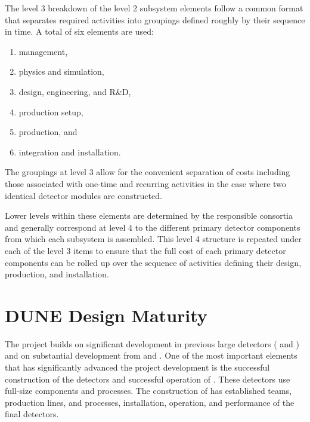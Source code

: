 The level 3 breakdown of the level 2 subsystem  elements follow 
a common format that separates required activities into groupings defined 
roughly by their sequence in time.  A total of six elements are used:     
\begin{enumerate}
  \item management,
  \item physics and simulation,
  \item design, engineering, and R\&D,
  \item production setup,
  \item production, and
  \item integration and installation.
\end{enumerate}
The groupings at level 3 allow for the convenient separation of costs
 including those associated with one-time and recurring activities in the
 case where two identical detector modules are constructed.

Lower levels within these  elements are determined by 
the responsible consortia and generally correspond at level 4 to 
the different primary detector components from which each subsystem
is assembled.  This level 4 structure is repeated under each of the 
level 3 items to ensure that the full cost of each primary detector 
components can be rolled up over the sequence of activities defining 
their design, production, and installation.       

\section{DUNE Design Maturity}

The  project builds on significant development in previous
large  detectors ( and )
and on substantial development from  and . One
of the most important elements that has significantly advanced the
project development is the successful construction of the
 detectors and successful operation of
. These detectors use full-size  components
and processes. The construction of  has established
teams, production lines,  and  processes,
installation, operation, and performance of the final 
detectors.

